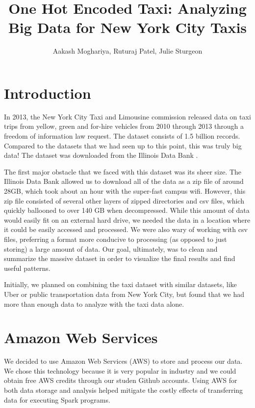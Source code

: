 \documentclass[11pt]{article} %
\title{One Hot Encoded Taxi: Analyzing Big Data for New York City Taxis}
\author{Aakash Moghariya, Ruturaj Patel, Julie Sturgeon}
\begin{document}
\maketitle

\section{Introduction}

In 2013, the New York City Taxi and Limousine commission released data on taxi trips from yellow, green and for-hire vehicles from 2010 through 2013 through a freedom of information law request. The dataset consists of 1.5 billion records. Compared to the datasets that we had seen up to this point, this was truly big data! The dataset was downloaded from the Illinois Data Bank \cite{dataset}.

The first major obstacle that we faced with this dataset was its sheer size. The Illinois Data Bank allowed us to download all of the data as a zip file of around 28GB, which took about an hour with the super-fast campus wifi. However, this zip file consisted of several other layers of zipped directories and csv files, which quickly ballooned to over 140 GB when decompressed. While this amount of data would easily fit on an external hard drive, we needed the data in a location where it could be easily accessed and processed. We were also wary of working with csv files, preferring a format more conducive to processing (as opposed to just storing) a large amount of data. Our goal, ultimately, was to clean and summarize the massive dataset in order to visualize the final results and find useful patterns.

Initially, we planned on combining the taxi dataset with similar datasets, like Uber or public transportation data from New York City, but found that we had more than enough data to analyze with the taxi data alone. 

\section{Amazon Web Services}

We decided to use Amazon Web Services (AWS) \cite{aws} to store and process our data. We chose this technology because it is very popular in industry and we could obtain free AWS credits through our studen Github accounts. Using AWS for both data storage and analysis helped mitigate the costly effects of transferring data for executing Spark programs. 
\end{document}
